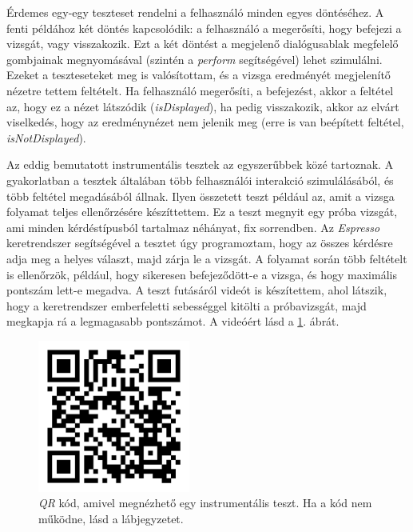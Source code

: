 \documentclass[12pt,a4paper]{article}
\begin{document}
	Érdemes egy-egy teszteset rendelni a felhasználó minden egyes döntéséhez. A fenti példához két döntés kapcsolódik: a felhasználó a megerősíti, hogy befejezi a vizsgát, vagy visszakozik. Ezt a két döntést a megjelenő dialógusablak megfelelő gombjainak megnyomásával (szintén a \textit{perform} segítségével) lehet szimulálni. Ezeket a teszteseteket meg is valósítottam, és a vizsga eredményét megjelenítő nézetre tettem feltételt. Ha felhasználó megerősíti, a befejezést, akkor a feltétel az, hogy ez a nézet látszódik (\textit{isDisplayed}), ha pedig visszakozik, akkor az elvárt viselkedés, hogy az eredménynézet nem jelenik meg (erre is van beépített feltétel, \textit{isNotDisplayed}).
	
	Az eddig bemutatott instrumentális tesztek az egyszerűbbek közé tartoznak. A gyakorlatban a tesztek általában több felhasználói interakció szimulálásából, és több feltétel megadásából állnak. Ilyen összetett teszt például az, amit a vizsga folyamat teljes ellenőrzésére készíttettem. Ez a teszt megnyit egy próba vizsgát, ami minden kérdéstípusból tartalmaz néhányat, fix sorrendben. Az \textit{Espresso} keretrendszer segítségével a tesztet úgy programoztam, hogy az összes kérdésre adja meg a helyes választ, majd zárja le a vizsgát. A folyamat során több feltételt is ellenőrzök, például, hogy sikeresen befejeződött-e a vizsga, és hogy maximális pontszám lett-e megadva. A teszt futásáról videót is készítettem, ahol látszik, hogy a keretrendszer emberfeletti sebességgel kitölti a próbavizsgát, majd megkapja rá a legmagasabb pontszámot. A videóért lásd a \ref{qr_instrumental_test}. ábrát.
	
	\begin{figure}[h!]
		\centering
		\includegraphics[width=5cm]{instrumental_test_qr_code}
		\caption[Alkalmazás instrumentális teszt Caption]{\textit{QR} kód, amivel megnézhető egy instrumentális teszt. Ha a kód nem működne, lásd a lábjegyzetet\footnotemark.}
		\label{qr_instrumental_test}
	\end{figure}
	
\end{document}
